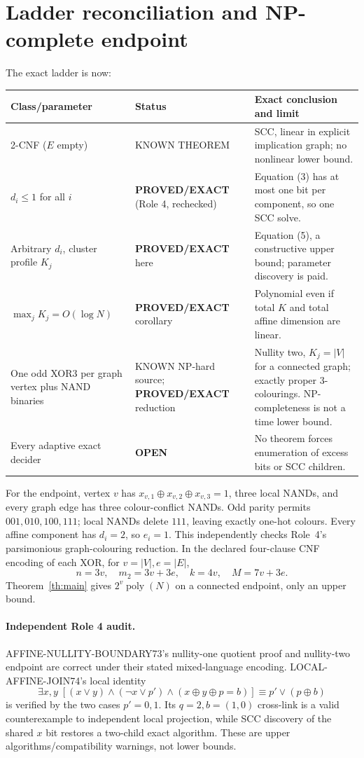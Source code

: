 \documentclass[11pt]{article}
\newcommand{\poly}{\operatorname{poly}}
\newcommand{\PROVED}{\textbf{PROVED/EXACT}}
\newcommand{\OPEN}{\textbf{OPEN}}
\begin{document}
\section{Ladder reconciliation and NP-complete endpoint}
The exact ladder is now:
\begin{center}\small
\begin{tabular}{p{.24\linewidth}p{.25\linewidth}p{.39\linewidth}}
\toprule
Class/parameter & Status & Exact conclusion and limit\\\midrule
2-CNF ($E$ empty) & KNOWN THEOREM & SCC, linear in explicit implication graph; no nonlinear lower bound.\\
$d_i\le1$ for all $i$ & \PROVED{} (Role 4, rechecked) & Equation (3) has at most one bit per component, so one SCC solve.\\
Arbitrary $d_i$, cluster profile $K_j$ & \PROVED{} here & Equation (5), a constructive upper bound; parameter discovery is paid.\\
$\max_jK_j=O(\log N)$ & \PROVED{} corollary & Polynomial even if total $K$ and total affine dimension are linear.\\
One odd XOR3 per graph vertex plus NAND binaries & KNOWN NP-hard source; \PROVED{} reduction & Nullity two, $K_j=|V|$ for a connected graph; exactly proper 3-colourings. NP-completeness is not a time lower bound.\\
Every adaptive exact decider & \OPEN{} & No theorem forces enumeration of excess bits or SCC children.\\
\bottomrule
\end{tabular}
\end{center}

For the endpoint, vertex $v$ has
$x_{v,1}\oplus x_{v,2}\oplus x_{v,3}=1$, three local NANDs, and every graph
edge has three colour-conflict NANDs.  Odd parity permits
$001,010,100,111$; local NANDs delete $111$, leaving exactly one-hot colours.
Every affine component has $d_i=2$, so $e_i=1$.  This independently checks
Role~4's parsimonious graph-colouring reduction.  In the declared four-clause
CNF encoding of each XOR, for $v=|V|,e=|E|$,
\[
n=3v,\quad m_2=3v+3e,\quad k=4v,\quad M=7v+3e.                      \tag{6}
\]
Theorem~\ref{th:main} gives $2^v\poly(N)$ on a connected endpoint, only an
upper bound.

\paragraph{Independent Role 4 audit.}
AFFINE-NULLITY-BOUNDARY73's nullity-one quotient proof and nullity-two
endpoint are correct under their stated mixed-language encoding.
LOCAL-AFFINE-JOIN74's local identity
\[
\exists x,y\;[(x\vee y)\wedge(\neg x\vee p')\wedge
(x\oplus y\oplus p=b)]\equiv p'\vee(p\oplus b)                     \tag{7}
\]
is verified by the two cases $p'=0,1$.  Its $q=2,b=(1,0)$ cross-link is a
valid counterexample to independent local projection, while SCC discovery
of the shared $x$ bit restores a two-child exact algorithm.  These are
upper algorithms/compatibility warnings, not lower bounds.
\end{document}
